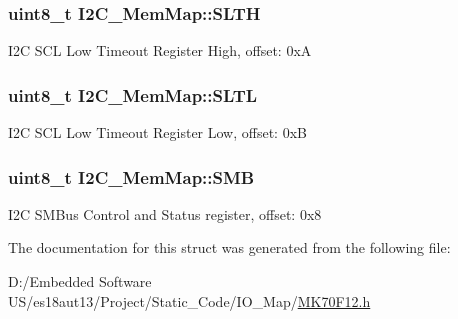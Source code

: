 \subsubsection[{S\+L\+T\+H}]{\setlength{\rightskip}{0pt plus 5cm}uint8\+\_\+t I2\+C\+\_\+\+Mem\+Map\+::\+S\+L\+T\+H}\label{struct_i2_c___mem_map_aac56d4be80ad622d7bf85bdd8c29504c}
I2\+C S\+C\+L Low Timeout Register High, offset\+: 0x\+A \hypertarget{struct_i2_c___mem_map_afd5aa3cef3245893addeb55556e1ceff}{}
\subsubsection[{S\+L\+T\+L}]{\setlength{\rightskip}{0pt plus 5cm}uint8\+\_\+t I2\+C\+\_\+\+Mem\+Map\+::\+S\+L\+T\+L}\label{struct_i2_c___mem_map_afd5aa3cef3245893addeb55556e1ceff}
I2\+C S\+C\+L Low Timeout Register Low, offset\+: 0x\+B \hypertarget{struct_i2_c___mem_map_a14ca29af4960a6588080acb71f62d5fa}{}
\subsubsection[{S\+M\+B}]{\setlength{\rightskip}{0pt plus 5cm}uint8\+\_\+t I2\+C\+\_\+\+Mem\+Map\+::\+S\+M\+B}\label{struct_i2_c___mem_map_a14ca29af4960a6588080acb71f62d5fa}
I2\+C S\+M\+Bus Control and Status register, offset\+: 0x8 

The documentation for this struct was generated from the following file\+:\begin{DoxyCompactItemize}
\item 
D\+:/\+Embedded Software U\+S/es18aut13/\+Project/\+Static\+\_\+\+Code/\+I\+O\+\_\+\+Map/\hyperlink{_m_k70_f12_8h}{M\+K70\+F12.\+h}\end{DoxyCompactItemize}
